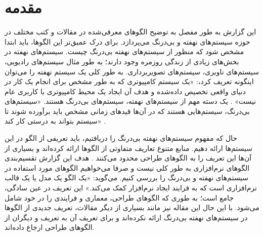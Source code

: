 \setlength\parindent{24pt}
\section{مقدمه}

\begin{RTL}
این گزارش به طور مفصل به توضیح الگوهای معرفی‌شده در مقالات و کتب مختلف
در حوزه سیستم‌های نهفته و بی‌درنگ می‌پردازد.
برای درک عمیق‌تر این الگوها، باید ابتدا مشخص شود که منظور
از سیستم‌های نهفته بی‌درنگ چیست.
سیستم‌های نهفته در بخش‌های زیادی از زندگی روزمره وجود دارند؛
به طور مثال سیستم‌های رادیویی، سیستم‌های ناوبری، سیستم‌های تصویربرداری.
به طور کلی یک سیستم نهفته را می‌توان اینگونه تعریف کرد،:
«یک سیستم کامپیوتری که به طور مشخص برای انجام یک کار در دنیای واقعی
تخصیص داده‌شده و هدف آن ایجاد یک محیط کامپیوتری
با کاربری عام نیست» \cite{ref1}.
یک دسته مهم از سیستم‌های نهفته، سیستم‌های بی‌درنگ هستند.
«سیستم‌های بی‌درنگ، سیستم‌هایی
هستند که در آن‌ها قیدهای زمانی مشخص باید برآورده شوند
تا سیستم بتواند به درستی کار کند» \cite{ref1}.
\end{RTL}

\begin{RTL}
حال که مفهوم سیستم‌های نهفته بی‌درنگ را دریافتیم، باید تعریفی از الگو در این سیستم‌ها
ارائه دهیم. منابع متنوع تعاریف متفاوتی از الگوها ارائه کرده‌اند و بسیاری از آن‌ها
این تعریف را به الگوهای طراحی محدود می‌کنند \cite{ref1}.
هدف این گزارش تقسیم‌بندی الگوهای نرم‌افزاری به طور کلی نیست و صرفا می‌خواهیم
الگوهای مورد استفاده در سیستم‌های نهفته و بی‌درنگ را بررسی کنیم.
 \cite{ref2} می‌گوید:
«یک الگو یک مدل یا یک قالب نرم‌افزاری است که به فرایند ایجاد نرم‌افزار کمک می‌کند.»
این تعریف در عین سادگی، جامع است؛ به طوری که الگوهای طراحی، معماری و فرایندی
را در خود شامل می‌شود. با این حال این مقاله نیز مانند بسیاری از دیگر مقالات،
تعریف جدیدی از الگوها در سیستم‌های نهفته بی‌درنگ ارائه نکرده‌اند و برای تعریف آن به
تعریف  و دیگران \cite{ref3} از الگوهای طراحی ارجاع داده‌اند.
\end{RTL}

\begin{RTL}
\end{RTL}

